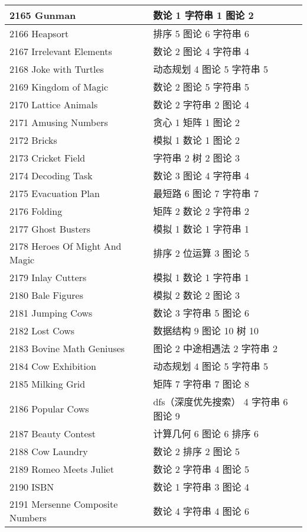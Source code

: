 \begin{longtable}{| p{} | p{} |}
 2165 Gunman  & 数论 1 字符串 1 图论 2 \\ \hline
 2166 Heapsort  & 排序 5 图论 6 字符串 6 \\ \hline
 2167 Irrelevant Elements  & 数论 2 图论 4 字符串 4 \\ \hline
 2168 Joke with Turtles  & 动态规划 4 图论 5 字符串 5 \\ \hline
 2169 Kingdom of Magic  & 数论 2 图论 5 字符串 5 \\ \hline
 2170 Lattice Animals  & 数论 2 字符串 2 图论 4 \\ \hline
 2171 Amusing Numbers  & 贪心 1 矩阵 1 图论 2 \\ \hline
 2172 Bricks  & 模拟 1 数论 1 图论 2 \\ \hline
 2173 Cricket Field  & 字符串 2 树 2 图论 3 \\ \hline
 2174 Decoding Task  & 数论 3 图论 4 字符串 4 \\ \hline
 2175 Evacuation Plan  & 最短路 6 图论 7 字符串 7 \\ \hline
 2176 Folding  & 矩阵 2 数论 2 字符串 2 \\ \hline
 2177 Ghost Busters  & 模拟 1 数论 1 字符串 1 \\ \hline
 2178 Heroes Of Might And Magic  & 排序 2 位运算 3 图论 5 \\ \hline
 2179 Inlay Cutters  & 模拟 1 数论 1 字符串 1 \\ \hline
 2180 Bale Figures  & 模拟 2 数论 2 图论 3 \\ \hline
 2181 Jumping Cows  & 数论 3 字符串 5 图论 6 \\ \hline
 2182 Lost Cows  & 数据结构 9 图论 10 树 10 \\ \hline
 2183 Bovine Math Geniuses  & 图论 2 中途相遇法 2 字符串 2 \\ \hline
 2184 Cow Exhibition  & 动态规划 4 图论 5 字符串 5 \\ \hline
 2185 Milking Grid  & 矩阵 7 字符串 7 图论 8 \\ \hline
 2186 Popular Cows  & dfs（深度优先搜索） 4 字符串 6 图论 9 \\ \hline
 2187 Beauty Contest  & 计算几何 6 图论 6 排序 6 \\ \hline
 2188 Cow Laundry  & 数论 2 排序 2 图论 5 \\ \hline
 2189 Romeo Meets Juliet  & 数论 2 字符串 4 图论 5 \\ \hline
 2190 ISBN  & 数论 1 字符串 3 图论 4 \\ \hline
 2191 Mersenne Composite Numbers  & 数论 4 字符串 4 图论 6 \\ \hline

\end{longtable}
